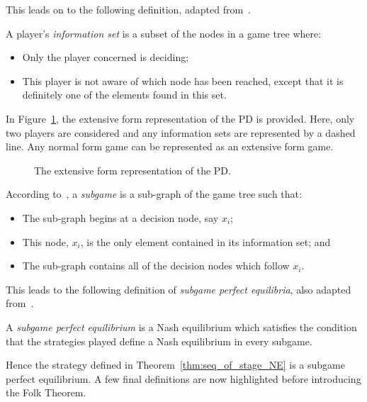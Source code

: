 This leads on to the following definition, adapted from~\cite{Webb2007}.

\begin{definition}
    A player's \textit{information set} is a subset of the nodes in a game tree
    where:
    \begin{itemize}
        \item Only the player concerned is deciding;
        \item This player is not aware of which node has been reached, except
        that it is definitely one of the elements found in this set.
    \end{itemize}     
\end{definition}

In Figure~\ref{fig:PD_game_tree}, the extensive form representation of the
PD is provided. Here, only two players are considered and
any information sets are represented by a dashed line. Any normal form
game can be represented as an extensive form game. 

\begin{figure}
    \centering
    
    \caption{The extensive form representation of the PD.}\label{fig:PD_game_tree}
\end{figure}

\begin{definition}
According to~\cite{Webb2007}, a \textit{subgame} is a sub-graph of the game tree
such that:
\begin{itemize}
    \item The sub-graph begins at a decision node, say \(x_{i}\);
    \item This node, \(x_{i}\), is the only element contained in its information
    set; and
    \item The sub-graph contains all of the decision nodes which follow \(x_{i}\).
\end{itemize}   
\end{definition}

This leads to the following definition of \textit{subgame perfect equilibria},
also adapted from~\cite{Webb2007}.

\begin{definition}
    A \textit{subgame perfect equilibrium} is a Nash equilibrium which satisfies
    the condition that the strategies played define a Nash equilibrium in every
    subgame.
\end{definition}

Hence the strategy defined in Theorem~\ref{thm:seq_of_stage_NE} is a subgame
perfect equilibrium. A few final definitions are now highlighted before
introducing the Folk Theorem.

